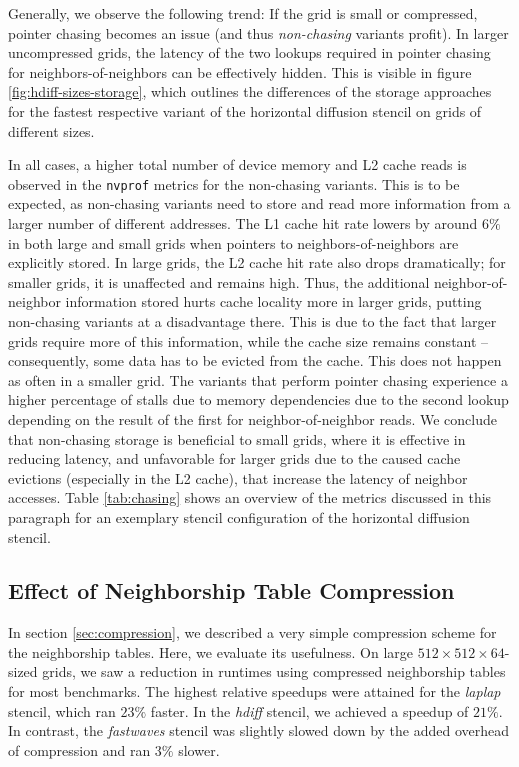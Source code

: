 Generally, we observe the following trend: If the grid is small or compressed, pointer chasing becomes an issue (and thus \emph{non-chasing} variants profit). In larger uncompressed grids, the latency of the two lookups required in pointer chasing for neighbors-of-neighbors can be effectively hidden. This is visible in figure \ref{fig:hdiff-sizes-storage}, which outlines the differences of the storage approaches for the fastest respective variant of the horizontal diffusion stencil on grids of different sizes. 

In all cases, a higher total number of device memory and L2 cache reads is observed in the \texttt{nvprof} metrics for the non-chasing variants. This is to be expected, as non-chasing variants need to store and read more information from a larger number of different addresses. The L1 cache hit rate lowers by around $6\%$ in both large and small grids when pointers to neighbors-of-neighbors are explicitly stored. In large grids, the L2 cache hit rate also drops dramatically; for smaller grids, it is unaffected and remains high. Thus, the additional neighbor-of-neighbor information stored hurts cache locality more in larger grids, putting non-chasing variants at a disadvantage there. This is due to the fact that larger grids require more of this information, while the cache size remains constant -- consequently, some data has to be evicted from the cache. This does not happen as often in a smaller grid. The variants that perform pointer chasing experience a higher percentage of stalls due to memory dependencies due to the second lookup depending on the result of the first for neighbor-of-neighbor reads.  We conclude that non-chasing storage is beneficial to small grids, where it is effective in reducing latency, and unfavorable for larger grids due to the caused cache evictions (especially in the L2 cache), that increase the latency of neighbor accesses. Table \ref{tab:chasing} shows an overview of the metrics discussed in this paragraph for an exemplary stencil configuration of the horizontal diffusion stencil.

\subsection{Effect of Neighborship Table Compression}

In section \ref{sec:compression}, we described a very simple compression scheme for the neighborship tables. Here, we evaluate its usefulness. On large $512\times 512\times 64$-sized grids, we saw a reduction in runtimes using compressed neighborship tables for most benchmarks. The highest relative speedups were attained for the \emph{laplap} stencil, which ran $23\%$ faster. In the \emph{hdiff} stencil, we achieved a speedup of $21\%$. In contrast, the \emph{fastwaves} stencil was slightly slowed down by the added overhead of compression and ran $3\%$ slower.

